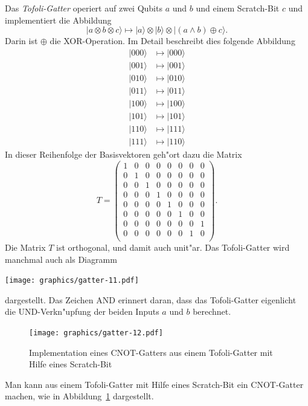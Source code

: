 \begin{beispiel}
Das {\em Tofoli-Gatter} operiert auf zwei Qubits $a$ und $b$ und einem
Scratch-Bit $c$ und implementiert die Abbildung
\[
|a\otimes b\otimes c\rangle
\mapsto
|a\rangle\otimes|b\rangle\otimes|(a\wedge b)\oplus c\rangle.
\]
Darin ist $\oplus$ die XOR-Operation. 
Im Detail beschreibt dies folgende Abbildung
\begin{align*}
|000\rangle&\mapsto|000\rangle\\
|001\rangle&\mapsto|001\rangle\\
|010\rangle&\mapsto|010\rangle\\
|011\rangle&\mapsto|011\rangle\\
|100\rangle&\mapsto|100\rangle\\
|101\rangle&\mapsto|101\rangle\\
|110\rangle&\mapsto|111\rangle\\
|111\rangle&\mapsto|110\rangle
\end{align*}
In dieser Reihenfolge der Basisvektoren geh"ort dazu die Matrix
\[
T=
\begin{pmatrix}
1&0&0&0&0&0&0&0\\
0&1&0&0&0&0&0&0\\
0&0&1&0&0&0&0&0\\
0&0&0&1&0&0&0&0\\
0&0&0&0&1&0&0&0\\
0&0&0&0&0&1&0&0\\
0&0&0&0&0&0&0&1\\
0&0&0&0&0&0&1&0\\
\end{pmatrix}.
\]
Die Matrix $T$ ist orthogonal, und damit auch unit"ar.
Das Tofoli-Gatter wird manchmal auch als Diagramm
\begin{center}
\texttt{[image: graphics/gatter-11.pdf]}
\end{center}
dargestellt. Das Zeichen \textsc{AND} erinnert daran, dass das Tofoli-Gatter
eigenlicht die UND-Verkn"upfung der beiden Inputs $a$ und $b$ berechnet.
\end{beispiel}

\begin{beispiel}
\begin{figure}
\centering
\texttt{[image: graphics/gatter-12.pdf]}
\caption{Implementation eines \textsc{CNOT}-Gatters aus einem Tofoli-Gatter
mit Hilfe eines Scratch-Bit \label{skript:cnot=tofoli}}
\end{figure}
Man kann aus einem Tofoli-Gatter mit Hilfe eines Scratch-Bit ein
\textsc{CNOT}-Gatter machen, wie in Abbildung~\ref{skript:cnot=tofoli}
dargestellt.
\end{beispiel}

